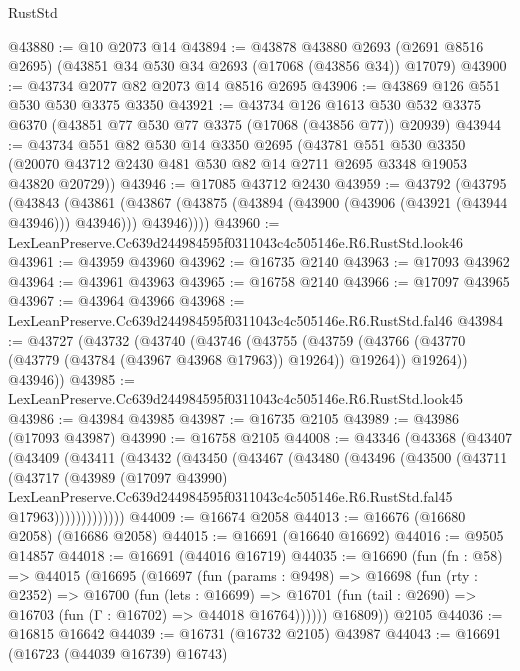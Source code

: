 \begin{lexlean}{RustStd}
\begin{coremodule}
@43880 := @10 @2073 @14
@43894 := @43878
    @43880
    @2693
    (@2691 @8516 @2695)
    (@43851 @34 @530 @34 @2693 (@17068 (@43856 @34)) @17079)
@43900 := @43734 @2077 @82 @2073 @14 @8516 @2695
@43906 := @43869 @126 @551 @530 @530 @3375 @3350
@43921 := @43734
    @126
    @1613
    @530
    @532
    @3375
    @6370
    (@43851 @77 @530 @77 @3375 (@17068 (@43856 @77)) @20939)
@43944 := @43734
    @551
    @82
    @530
    @14
    @3350
    @2695
    (@43781
      @551
      @530
      @3350
      (@20070 @43712 @2430 @481 @530 @82 @14 @2711 @2695 @3348 @19053 @43820 @20729))
@43946 := @17085 @43712 @2430
@43959 := @43792
    (@43795
      (@43843
        (@43861
          (@43867 (@43875 (@43894 (@43900 (@43906 (@43921 (@43944 @43946))) @43946))) @43946))))
@43960 := LexLeanPreserve.Cc639d244984595f0311043c4c505146e.R6.RustStd.look46
@43961 := @43959 @43960
@43962 := @16735 @2140
@43963 := @17093 @43962
@43964 := @43961 @43963
@43965 := @16758 @2140
@43966 := @17097 @43965
@43967 := @43964 @43966
@43968 := LexLeanPreserve.Cc639d244984595f0311043c4c505146e.R6.RustStd.fal46
@43984 := @43727
    (@43732
      (@43740
        (@43746
          (@43755
            (@43759 (@43766 (@43770 (@43779 (@43784 (@43967 @43968 @17963)) @19264)) @19264))
            @19264))
        @43946))
@43985 := LexLeanPreserve.Cc639d244984595f0311043c4c505146e.R6.RustStd.look45
@43986 := @43984 @43985
@43987 := @16735 @2105
@43989 := @43986 (@17093 @43987)
@43990 := @16758 @2105
@44008 := @43346
    (@43368
      (@43407
        (@43409
          (@43411
            (@43432
              (@43450
                (@43467
                  (@43480
                    (@43496
                      (@43500
                        (@43711
                          (@43717
                            (@43989
                              (@17097 @43990)
                              LexLeanPreserve.Cc639d244984595f0311043c4c505146e.R6.RustStd.fal45
                              @17963)))))))))))))
@44009 := @16674 @2058
@44013 := @16676 (@16680 @2058) (@16686 @2058)
@44015 := @16691 (@16640 @16692)
@44016 := @9505 @14857
@44018 := @16691 (@44016 @16719)
@44035 := @16690
    (fun (fn : @58) =>
    @44015
      (@16695
        (@16697
          (fun (params : @9498) =>
          @16698
            (fun (rty : @2352) =>
            @16700
              (fun (lets : @16699) =>
              @16701 (fun (tail : @2690) => @16703 (fun (Γ : @16702) => @44018 @16764))))))
        @16809))
    @2105
@44036 := @16815 @16642
@44039 := @16731 (@16732 @2105) @43987
@44043 := @16691 (@16723 (@44039 @16739) @16743)

\end{coremodule}
\end{lexlean}
